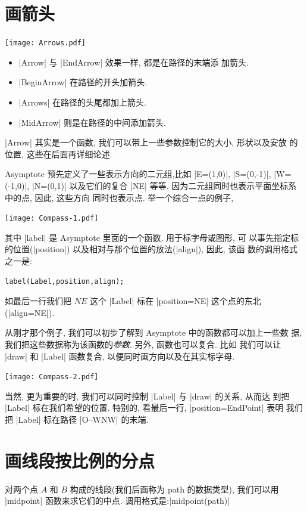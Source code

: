 \documentclass[nofonts,CJKnormalspaces]{ctexbook}
\begin{document}
\section{画箭头}
\begin{center}\texttt{[image: Arrows.pdf]}\end{center}%


\begin{itemize}
\item |Arrow| 与 |EndArrow| 效果一样, 都是在路径的末端添
  加箭头.
\item |BeginArrow| 在路径的开头加箭头.
\item |Arrows| 在路径的头尾都加上箭头.
\item |MidArrow| 则是在路径的中间添加箭头.
\end{itemize}
|Arrow| 其实是一个函数, 我们可以带上一些参数控制它的大小, 形状以及安放
的位置, 这些在后面再详细论述.

Asymptote 预先定义了一些表示方向的二元组,比如  |E=(1,0)|,
|S=(0,-1)|, |W=(-1,0)|, |N=(0,1)| 以及它们的复合
|NE| 等等. 因为二元组同时也表示平面坐标系中的点, 因此, 这些方向
同时也表示点. 举一个综合一点的例子,

\begin{center}\texttt{[image: Compass-1.pdf]}\end{center}%


其中 |label| 是 Asymptote 里面的一个函数, 用于标字母或图形, 可
以事先指定标的位置(|position|) 以及相对与那个位置的放法(|align|), 因此, 该函
数的调用格式之一是:
\begin{verbatim}
label(Label,position,align);
\end{verbatim}
如最后一行我们把 $NE$ 这个 |Label| 标在 |position=NE| 这个点的东北
(|align=NE|).

从刚才那个例子, 我们可以初步了解到 Asymptote 中的函数都可以加上一些数
据, 我们把这些数据称为该函数的\emph{参数}. 另外, 函数也可以复合. 比如
我们可以让 |draw| 和 |Label| 函数复合, 以便同时画方向以及在其实标字母.
\begin{center}\texttt{[image: Compass-2.pdf]}\end{center}%

当然, 更为重要的时, 我们可以同时控制 |Label| 与 |draw| 的关系, 从而达
到把 |Label| 标在我们希望的位置. 特别的, 看最后一行, |position=EndPoint| 表明
我们把 |Label| 标在路径 |O--WNW| 的末端.

\section{画线段按比例的分点}
对两个点 $A$ 和 $B$ 构成的线段(我们后面称为 {path} 的数据类型),
我们可以用 |midpoint| 函数来求它们的中点.
调用格式是:|midpoint(path)|
\end{document}
